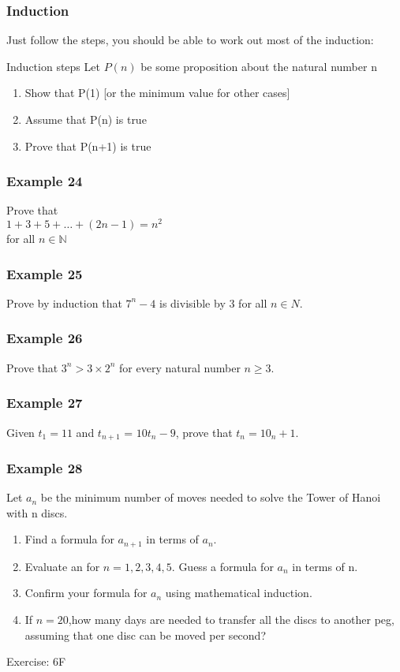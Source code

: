 \documentclass{beamer}
\begin{document}
\begin{frame}
    \frametitle{Induction}
    Just follow the steps, you should be able to work out most of the induction:\\
    \begin{block}{Induction steps}
        Let $P(n)$ be some proposition about the natural number n\\
        \begin{enumerate}
            \item Show that P(1) [or the minimum value for other cases]
            \item Assume that P(n) is true
            \item Prove that P(n+1) is true
        \end{enumerate}
    \end{block}  

\end{frame}

\begin{frame}[t]
    \frametitle{Example 24}
    Prove that \\
    $1 + 3 + 5 + \dots + (2n-1) = n^2$\\
    for all $n \in \mathbb{N}$
\end{frame}

\begin{frame}[t]
    \frametitle{Example 25}
    Prove by induction that $7^n - 4$ is divisible by $3$ for all $n \in N$.
\end{frame}

\begin{frame}[t]
    \frametitle{Example 26}
    Prove that $3^n > 3 \times 2^n$ for every natural number $n \geq 3$.
\end{frame}

\begin{frame}[t]
    \frametitle{Example 27}
    Given $t_1 = 11$ and $t_{n+1}$ = $10t_n - 9$, prove that $t_n = 10_n +1$.
    

\end{frame}

\begin{frame}[t]
    \frametitle{Example 28}
    Let $a_n$ be the minimum number of moves needed to solve the Tower of Hanoi with n discs.
    \begin{enumerate}
        \item Find a formula for $a_{n+1}$ in terms of $a_n$.
        \item Evaluate an for $n = 1,2,3,4,5$. Guess a formula for $a_n$ in terms of n.
        \item Confirm your formula for $a_n$ using mathematical induction.
        \item  If $n =20$,how many days are needed to transfer all the discs to another peg, assuming
        that one disc can be moved per second?
    \end{enumerate}
\end{frame}
\begin{frame}
\end{frame}
\begin{frame}
\end{frame}

\begin{frame}{Exercise: 6F}
\end{frame}
\end{document}
